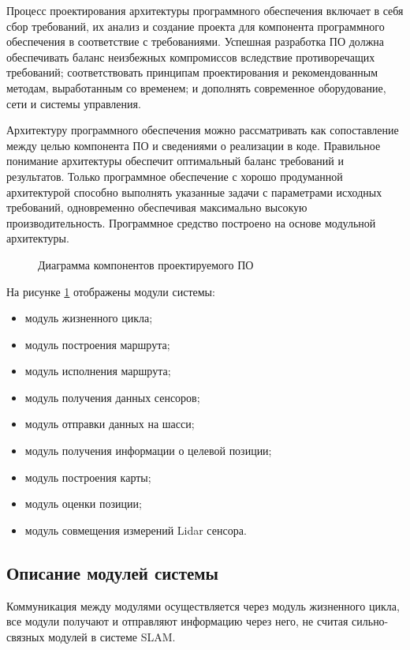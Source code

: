 Процесс проектирования архитектуры программного обеспечения включает в себя сбор
требований, их анализ и создание проекта для компонента программного
обеспечения в соответствие с требованиями. Успешная разработка ПО должна
обеспечивать баланс неизбежных компромиссов вследствие противоречащих
требований;  соответствовать  принципам  проектирования  и  рекомендованным
методам,  выработанным  со  временем;  и  дополнять  современное оборудование,
сети и системы управления. 

Архитектуру  программного  обеспечения  можно рассматривать  как  сопоставление
между целью компонента ПО и сведениями о реализации в коде. Правильное понимание
архитектуры  обеспечит  оптимальный баланс требований и результатов. Только
программное обеспечение с хорошо продуманной архитектурой способно выполнять
указанные задачи с параметрами исходных требований, одновременно обеспечивая
максимально высокую производительность. Программное средство построено на основе
модульной архитектуры. 

\FloatBarrier
\begin{figure}[H]
\label{fig:components}
\centering
\caption{Диаграмма компонентов проектируемого ПО}
\end{figure}

На рисунке \ref{fig:components} отображены модули системы:~
\begin{itemize}
	\item модуль жизненного цикла;
	\item модуль построения маршрута;
	\item модуль исполнения маршрута;
	\item модуль получения данных сенсоров;
	\item модуль отправки данных на шасси;
	\item модуль получения информации о целевой позиции;
	\item модуль построения карты;
	\item модуль оценки позиции;
	\item модуль совмещения измерений Lidar сенсора.
\end{itemize}

\subsection{Описание модулей системы}

Коммуникация между модулями осуществляется через модуль жизненного цикла, все
модули получают и отправляют информацию через него, не считая сильно-связных
модулей в системе SLAM. 


